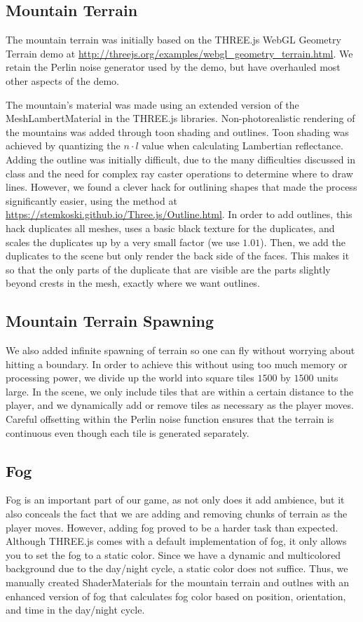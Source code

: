 \documentclass{article}
\begin{document}
\subsection{Mountain Terrain}
The mountain terrain was initially based on the THREE.js WebGL Geometry Terrain demo at \url{http://threejs.org/examples/webgl_geometry_terrain.html}. We retain the Perlin noise generator used by the demo, but have overhauled most other aspects of the demo.

The mountain's material was made using an extended version of the MeshLambertMaterial in the THREE.js libraries. Non-photorealistic rendering of the mountains was added through toon shading and outlines. Toon shading was achieved by quantizing the $n \cdot l$ value when calculating Lambertian reflectance. Adding the outline was initially difficult, due to the many difficulties discussed in class and the need for complex ray caster operations to determine where to draw lines. However, we found a clever hack for outlining shapes that made the process significantly easier, using the method at \url{https://stemkoski.github.io/Three.js/Outline.html}. In order to add outlines, this hack duplicates all meshes, uses a basic black texture for the duplicates, and scales the duplicates up by a very small factor (we use $1.01$). Then, we add the duplicates to the scene but only render the back side of the faces. This makes it so that the only parts of the duplicate that are visible are the parts slightly beyond crests in the mesh, exactly where we want outlines.

\subsection{Mountain Terrain Spawning}
We also added infinite spawning of terrain so one can fly without worrying about hitting a boundary. In order to achieve this without using too much memory or processing power, we divide up the world into square tiles $1500$ by $1500$ units large. In the scene, we only include tiles that are within a certain distance to the player, and we dynamically add or remove tiles as necessary as the player moves. Careful offsetting within the Perlin noise function ensures that the terrain is continuous even though each tile is generated separately.

\subsection{Fog}
Fog is an important part of our game, as not only does it add ambience, but it also conceals the fact that we are adding and removing chunks of terrain as the player moves. However, adding fog proved to be a harder task than expected. Although THREE.js comes with a default implementation of fog, it only allows you to set the fog to a static color. Since we have a dynamic and multicolored background due to the day/night cycle, a static color does not suffice. Thus, we manually created ShaderMaterials for the mountain terrain and outlnes with an enhanced version of fog that calculates fog color based on position, orientation, and time in the day/night cycle.
\end{document}
